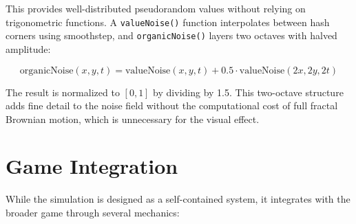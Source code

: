 \documentclass[12pt, titlepage]{article}
\begin{document}
This provides well-distributed pseudorandom values without relying on
trigonometric functions. A \texttt{valueNoise()} function interpolates between
hash corners using smoothstep, and \texttt{organicNoise()} layers two octaves
with halved amplitude:

\begin{equation}
    \text{organicNoise}(x, y, t) = \text{valueNoise}(x, y, t) +
    0.5 \cdot \text{valueNoise}(2x, 2y, 2t)
\end{equation}

The result is normalized to $[0, 1]$ by dividing by 1.5. This two-octave
structure adds fine detail to the noise field without the computational cost of
full fractal Brownian motion, which is unnecessary for the visual effect.

\section{Game Integration}
\label{sec:game}

While the simulation is designed as a self-contained system, it integrates with
the broader game through several mechanics:
\end{document}
